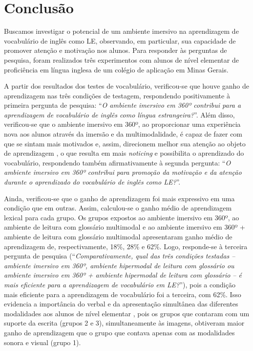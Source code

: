 \section{Conclusão}\label{sec-conclusao}

Buscamos investigar o potencial de um ambiente imersivo na aprendizagem de
vocabulário de inglês como LE, observando, em particular, sua capacidade de
promover atenção e motivação nos alunos. Para responder às perguntas de
pesquisa, foram realizados três experimentos com alunos de nível elementar de
proficiência em língua inglesa de um colégio de aplicação em Minas Gerais.

A partir dos resultados dos testes de vocabulário, verificou-se que houve ganho
de aprendizagem nas três condições de testagem, respondendo positivamente à
primeira pergunta de pesquisa: ``\emph{O ambiente imersivo em 360º contribui para a
aprendizagem de vocabulário de inglês como língua estrangeira?}''. Além disso,
verificou-se que o ambiente imersivo em 360º, ao proporcionar uma experiência
nova aos alunos através da imersão e da multimodalidade, é capaz de fazer com
que se sintam mais motivados e, assim, direcionem melhor sua atenção ao objeto
de aprendizagem \cite{gardner2010}, o que resulta em mais \emph{noticing} \cite{schmidit1990}
e possibilita o aprendizado do vocabulário, respondendo também afirmativamente
à segunda pergunta: ``\emph{O ambiente imersivo em 360º contribui para promoção da
motivação e da atenção durante o aprendizado do vocabulário de inglês como
LE?}''.

Ainda, verificou-se que o ganho de aprendizagem foi mais expressivo em uma
condição que em outras. Assim, calculou-se o ganho médio de aprendizagem
lexical para cada grupo. Os grupos expostos ao ambiente imersivo em 360º, ao
ambiente de leitura com glossário multimodal e ao ambiente imersivo em 360º +
ambiente de leitura com glossário multimodal apresentaram ganho médio de
aprendizagem de, respectivamente, 18\%, 28\% e 62\%. Logo, responde-se à terceira
pergunta de pesquisa (``\emph{Comparativamente, qual das três condições testadas –
ambiente imersivo em 360º, ambiente hipermodal de leitura com glossário ou
ambiente imersivo em 360º + ambiente hipermodal de leitura com glossário – é
mais eficiente para a aprendizagem de vocabulário em LE?}''), pois a condição
mais eficiente para a aprendizagem de vocabulário foi a terceira, com 62\%. Isso
evidencia a importância do verbal e da apresentação simultânea das diferentes
modalidades aos alunos de nível elementar \cite{procopio2016}, pois os grupos que
contaram com um suporte da escrita (grupos 2 e 3), simultaneamente às imagens,
obtiveram maior ganho de aprendizagem que o grupo que contava apenas com as
modalidades sonora e visual (grupo 1).


